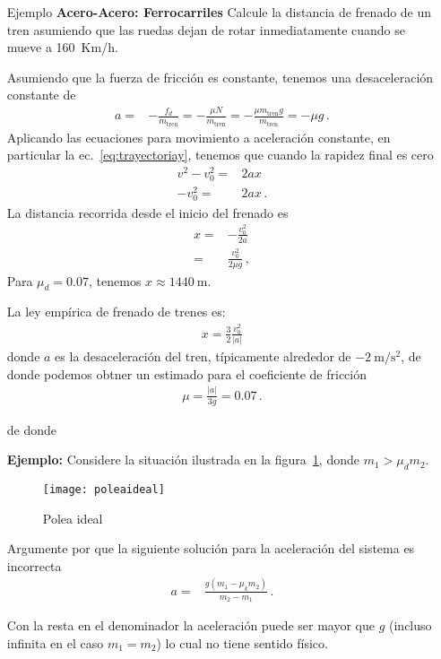 \begin{itemize}
\item[Ejemplo] \textbf{Acero-Acero: Ferrocarriles} Calcule la distancia de frenado de un tren asumiendo que las ruedas dejan de rotar inmediatamente cuando se mueve a 160~Km/h.

Asumiendo que la fuerza de fricción es constante, tenemos una desaceleración constante de
\begin{align}
  a=&-\frac{f_d}{m_{\text{tren}}}=-\frac{\mu N}{m_{\text{tren}}}=-\frac{\mu m_{\text{tren}} g}{m_{\text{tren}}}=
-\mu g\,.
\end{align}
Aplicando las ecuaciones para movimiento a aceleración constante, en particular la ec.~\eqref{eq:trayectoriay}, tenemos que cuando la rapidez final es cero
\begin{align}
  v^2-v^2_0=&2 a x\nonumber\\
  -v^2_0=&2 a x\,.
\end{align}
La distancia recorrida desde el inicio del frenado es
\begin{align}
  x=&-\frac{v^2_0}{2a}\nonumber\\
 =&\frac{v_0^2}{2\mu g}\,,
\end{align}
Para $\mu_d=0.07$, tenemos $x\approx 1440\ $m.

La ley empírica de frenado de trenes es:
\begin{align}
  x=\frac{3}{2}\frac{v_0^2}{|a|}
\end{align}
donde $a$ es la desaceleración del tren, típicamente alrededor de $-2\ \text{m}/\text{s}^2$, de donde podemos obtner un estimado para el coeficiente de fricción
\begin{align*}
  \mu=\frac{|a|}{3g}=0.07\,.
\end{align*}

de donde 
\end{itemize}

\begin{itemize}
\item[\textbf{Ejemplo:}] Considere la situación ilustrada en la figura~\ref{fig:poleaideal}, donde $m_1>\mu_d m_2$. 

\begin{frame}
  \begin{figure}
    \centering
    \texttt{[image: poleaideal]}
    \caption{Polea ideal}
    \label{fig:poleaideal}
  \end{figure}
Argumente por que la siguiente solución para la aceleración del sistema es incorrecta
\begin{align*}
      a=&\frac{g(m_1-\mu_k m_2)}{m_2-m_1}\,.
\end{align*}
\end{frame}

Con la resta en el denominador la aceleración puede ser mayor que $g$ (incluso infinita en el caso $m_1=m_2$) lo cual no tiene sentido físico.

\end{itemize}

